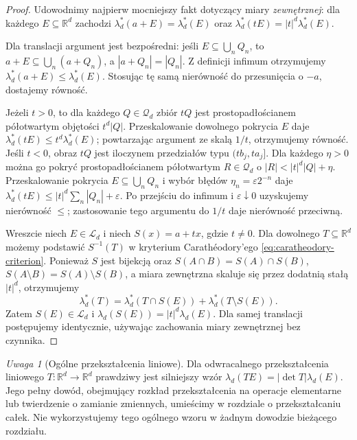\documentclass[11pt,a4paper,oneside]{book}
\numberwithin{equation}{chapter}
\theoremstyle{plain}
\theoremstyle{definition}
\theoremstyle{remark}
\newtheorem{uwaga}[twierdzenie]{Uwaga}
\begin{document}
\begin{proof}
Udowodnimy najpierw mocniejszy fakt dotyczący miary
\emph{zewnętrznej}: dla każdego $E\subseteq\mathbb R^d$
zachodzi
$\lambda_d^*(a+E)=\lambda_d^*(E)$ oraz
$\lambda_d^*(tE)=|t|^d\lambda_d^*(E)$.

Dla translacji argument jest bezpośredni: jeśli
$E\subseteq\bigcup_nQ_n$, to
$a+E\subseteq\bigcup_n(a+Q_n)$, a
$|a+Q_n|=|Q_n|$. Z definicji infimum otrzymujemy
$\lambda_d^*(a+E)\le\lambda_d^*(E)$.
Stosując tę samą nierówność do przesunięcia o $-a$,
dostajemy równość.

Jeżeli $t>0$, to dla każdego $Q\in\mathcal Q_d$
zbiór $tQ$ jest prostopadłościanem półotwartym
objętości $t^d|Q|$. Przeskalowanie dowolnego
pokrycia $E$ daje
$\lambda_d^*(tE)\le t^d\lambda_d^*(E)$;
powtarzając argument ze skalą $1/t$, otrzymujemy
równość. Jeśli $t<0$, obraz $tQ$ jest iloczynem
przedziałów typu $(tb_j,ta_j]$. Dla każdego
$\eta>0$ można go pokryć prostopadłościanem
półotwartym $R\in\mathcal Q_d$ o
$|R|<|t|^d|Q|+\eta$. Przeskalowanie pokrycia
$E\subseteq\bigcup_nQ_n$ i wybór błędów
$\eta_n=\varepsilon2^{-n}$ daje
$\lambda_d^*(tE)\le |t|^d\sum_n|Q_n|+\varepsilon$.
Po przejściu do infimum i $\varepsilon\downarrow0$
uzyskujemy nierówność $\le$; zastosowanie tego
argumentu do $1/t$ daje nierówność przeciwną.

Wreszcie niech $E\in\mathcal L_d$ i niech
$S(x)=a+tx$, gdzie $t\ne0$. Dla dowolnego
$T\subseteq\mathbb R^d$ możemy podstawić
$S^{-1}(T)$ w kryterium Carathéodory'ego
\eqref{eq:caratheodory-criterion}. Ponieważ $S$ jest
bijekcją oraz
$S(A\cap B)=S(A)\cap S(B)$,
$S(A\setminus B)=S(A)\setminus S(B)$,
a miara zewnętrzna skaluje się przez dodatnią
stałą $|t|^d$, otrzymujemy
\[
\lambda_d^*(T)=\lambda_d^*(T\cap S(E))
+\lambda_d^*(T\setminus S(E)).
\]
Zatem $S(E)\in\mathcal L_d$ i
$\lambda_d(S(E))=|t|^d\lambda_d(E)$.
Dla samej translacji postępujemy identycznie,
używając zachowania miary zewnętrznej bez czynnika.
\end{proof}

\begin{uwaga}[Ogólne przekształcenia liniowe]
Dla odwracalnego przekształcenia liniowego
$T:\mathbb R^d\to\mathbb R^d$ prawdziwy jest
silniejszy wzór $\lambda_d(TE)=|\det T|\lambda_d(E)$.
Jego pełny dowód, obejmujący rozkład przekształcenia
na operacje elementarne lub twierdzenie o zamianie
zmiennych, umieścimy w rozdziale o przekształcaniu całek.
Nie wykorzystujemy tego ogólnego wzoru w żadnym
dowodzie bieżącego rozdziału.
\end{uwaga}
\end{document}
